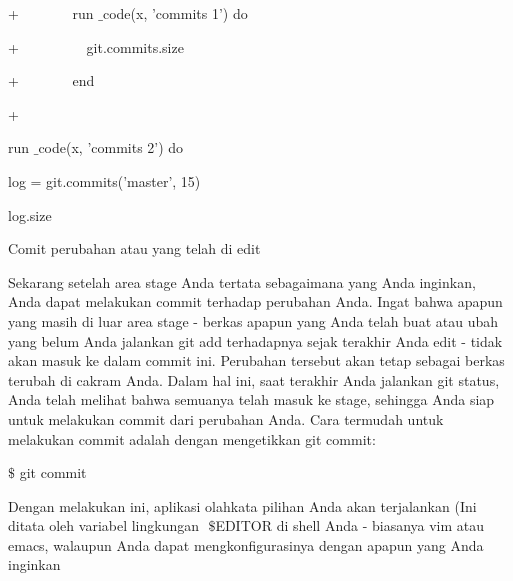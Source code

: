 \vspace{14pt}
\noindent 
{\fontsize{14pt}{14pt}\selectfont +~~~~~~~ run $  \_  $code(x, 'commits 1') do \\} \par
\noindent 
{\fontsize{14pt}{14pt}\selectfont +~~~~~~~~~ git.commits.size \\} \par
\noindent 
{\fontsize{14pt}{14pt}\selectfont +~~~~~~~ end \\} \par
\noindent 
{\fontsize{14pt}{14pt}\selectfont + \\} \par
\noindent 
{\fontsize{14pt}{14pt}\selectfont run $  \_  $code(x, 'commits 2') do \\} \par
\noindent 
{\fontsize{14pt}{14pt}\selectfont log = git.commits('master', 15) \\} \par
\noindent 
{\fontsize{14pt}{14pt}\selectfont log.size \\} \par
\vspace{14pt}
\noindent 
{\fontsize{14pt}{14pt}\selectfont Comit perubahan atau yang telah di edit \\} \par
\vspace{14pt}
\noindent 
{\fontsize{14pt}{14pt}\selectfont Sekarang setelah area stage Anda tertata sebagaimana yang Anda inginkan, Anda dapat melakukan commit terhadap perubahan Anda. Ingat bahwa apapun yang masih di luar area stage - berkas apapun yang Anda telah buat atau ubah yang belum Anda jalankan $  $git add $  $terhadapnya sejak terakhir Anda edit - tidak akan masuk ke dalam commit ini. Perubahan tersebut akan tetap sebagai berkas terubah di cakram Anda. Dalam hal ini, saat terakhir Anda jalankan $  $git status, Anda telah melihat bahwa semuanya telah masuk ke stage, sehingga Anda siap untuk melakukan commit dari perubahan Anda. Cara termudah untuk melakukan commit adalah dengan mengetikkan $  $git commit: \\} \par
\vspace{14pt}
\noindent 
{\fontsize{14pt}{14pt}\selectfont  $  \$  $ git commit \\} \par
\vspace{14pt}
\noindent 
{\fontsize{14pt}{14pt}\selectfont Dengan melakukan ini, aplikasi olahkata pilihan Anda akan terjalankan (Ini ditata oleh variabel lingkungan $  $ $  \$  $EDITOR $  $di shell Anda - biasanya vim atau emacs, walaupun Anda dapat mengkonfigurasinya dengan apapun yang Anda inginkan  \\} \par
